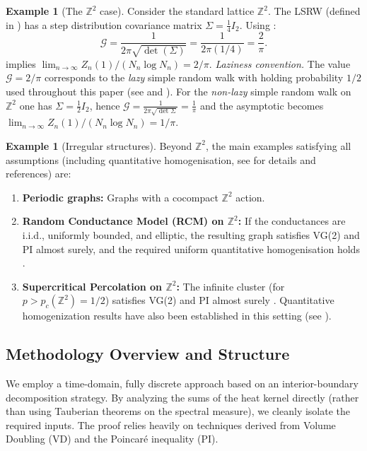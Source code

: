\documentclass{article}
\numberwithin{equation}{section}
\theoremstyle{definition}
\newtheorem{example}[theorem]{Example}
\theoremstyle{remark}
\newcommand{\cG}{\mathcal{G}}
\begin{document}
\begin{example}[The $\mathbb{Z}^2$ case]\label{rem:pi2}
Consider the standard lattice $\mathbb{Z}^2$. The LSRW (defined in ) has a step distribution covariance matrix $\Sigma = \frac{1}{4} I_2$. Using :
\[
\cG = \frac{1}{2\pi \sqrt{\det(\Sigma)}} = \frac{1}{2\pi (1/4)} = \frac{2}{\pi}.
\]
 implies $\lim_{n \to \infty} Z_n(1) / (N_n \log N_n) = 2/\pi$.
%
\smallskip
\noindent\emph{Laziness convention.}
The value $\cG=2/\pi$ corresponds to the \emph{lazy} simple random walk with holding probability $1/2$ used throughout this paper (see  and ). For the \emph{non-lazy} simple random walk on $\mathbb{Z}^2$ one has $\Sigma=\tfrac{1}{2}I_2$, hence $\cG=\tfrac{1}{2\pi\sqrt{\det\Sigma}}=\tfrac{1}{\pi}$ and the asymptotic becomes $\lim_{n\to\infty} Z_n(1)/(N_n\log N_n)=1/\pi$.
\end{example}


\begin{example}[Irregular structures]\label{ex:irregular}
Beyond $\mathbb{Z}^2$, the main examples satisfying all assumptions (including quantitative homogenisation, see  for details and references) are:
\begin{enumerate}
    \item \textbf{Periodic graphs:} Graphs with a cocompact $\mathbb{Z}^2$ action.
    \item \textbf{Random Conductance Model (RCM) on $\mathbb{Z}^2$:} If the conductances are i.i.d., uniformly bounded, and elliptic, the resulting graph satisfies VG(2) and PI almost surely, and the required uniform quantitative homogenisation holds \cite{Biskup11, AndresDeuschelSlowik19}.
    \item \textbf{Supercritical Percolation on $\mathbb{Z}^2$:} The infinite cluster (for $p>p_c(\mathbb{Z}^2)=1/2$) satisfies VG(2) and PI almost surely \cite{Barlow04}. Quantitative homogenization results have also been established in this setting (see ).
\end{enumerate}
\end{example}


\subsection{Methodology Overview and Structure}

We employ a time-domain, fully discrete approach based on an interior-boundary decomposition strategy. By analyzing the sums of the heat kernel directly (rather than using Tauberian theorems on the spectral measure), we cleanly isolate the required inputs. The proof relies heavily on techniques derived from Volume Doubling (VD) and the Poincaré inequality (PI).
\end{document}
